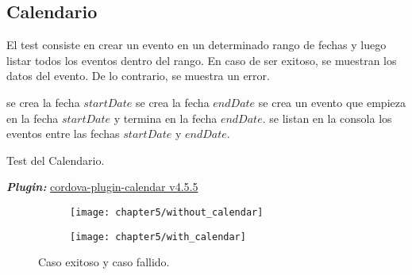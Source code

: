 \subsection{Calendario}
El test consiste en crear un evento en un determinado rango de fechas y luego listar todos los eventos dentro del rango. En caso de ser exitoso, se muestran los datos del evento. De lo contrario, se muestra un error.\\
\begin{algorithm}
	\begin{algorithmic}[1]
		\STATE se crea la fecha $startDate$
		\STATE se crea la fecha $endDate$
		\STATE se crea un evento que empieza en la fecha $startDate$ y termina en la fecha $endDate$.
		\STATE se listan en la consola los eventos entre las fechas $startDate$ y $endDate$.
	\end{algorithmic}
	\caption{Test del Calendario.}\label{alg:chap5:test_calendario}
\end{algorithm}
\textbf{\emph{Plugin:}} \href{https://www.npmjs.com/package/cordova-plugin-calendar}{cordova-plugin-calendar v4.5.5}
\begin{figure}[hbtp]
    \centering
    \begin{subfigure}{0.3\linewidth}
        \texttt{[image: chapter5/without\_calendar]}
        \label{fig:ch05:without_calendar}
    \end{subfigure}
    \begin{subfigure}{0.3\linewidth}
        \texttt{[image: chapter5/with\_calendar]}
        \label{fig:ch05:with_calendar}
    \end{subfigure}
    \caption{Caso exitoso y caso fallido.}
	\label{fig:ch05:calendar-cases}
\end{figure}
\newpage
